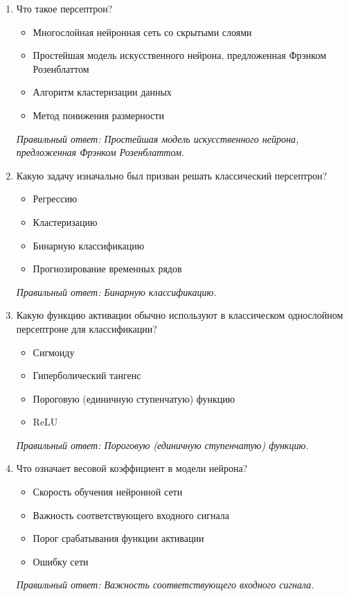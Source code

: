 \small
\begin{enumerate}[label=\textbf{\arabic*.}, leftmargin=0pt, itemsep=1.2em]
\item Что такое персептрон?
\begin{itemize}[label=$\square$, leftmargin=1.5cm, itemsep=0.2em, topsep=0.3em]
\item Многослойная нейронная сеть со скрытыми слоями
\item Простейшая модель искусственного нейрона, предложенная Фрэнком Розенблаттом
\item Алгоритм кластеризации данных
\item Метод понижения размерности
\end{itemize}
{\small\textit{Правильный ответ: Простейшая модель искусственного нейрона, предложенная Фрэнком Розенблаттом.}}

\item Какую задачу изначально был призван решать классический персептрон?
\begin{itemize}[label=$\square$, leftmargin=1.5cm, itemsep=0.2em, topsep=0.3em]
\item Регрессию
\item Кластеризацию
\item Бинарную классификацию
\item Прогнозирование временных рядов
\end{itemize}
{\small\textit{Правильный ответ: Бинарную классификацию.}}

\item Какую функцию активации обычно используют в классическом однослойном персептроне для классификации?
\begin{itemize}[label=$\square$, leftmargin=1.5cm, itemsep=0.2em, topsep=0.3em]
\item Сигмоиду
\item Гиперболический тангенс
\item Пороговую (единичную ступенчатую) функцию
\item ReLU
\end{itemize}
{\small\textit{Правильный ответ: Пороговую (единичную ступенчатую) функцию.}}

\item Что означает весовой коэффициент в модели нейрона?
\begin{itemize}[label=$\square$, leftmargin=1.5cm, itemsep=0.2em, topsep=0.3em]
\item Скорость обучения нейронной сети
\item Важность соответствующего входного сигнала
\item Порог срабатывания функции активации
\item Ошибку сети
\end{itemize}
{\small\textit{Правильный ответ: Важность соответствующего входного сигнала.}}


\end{enumerate}
